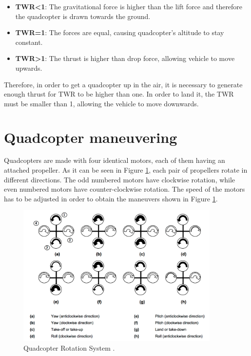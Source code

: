 \begin{itemize}
\item \textbf{TWR<1}: The gravitational force is higher than the lift force and therefore the quadcopter is drawn towards the ground.
\item \textbf{TWR=1}: The forces are equal, causing quadcopter's altitude to stay constant.
\item \textbf{TWR>1}: The thrust is higher than drop force, allowing vehicle to move upwards.
\end{itemize}

Therefore, in order to get a quadcopter up in the air, it is necessary to generate enough thrust for TWR to be higher than one. In order to land it, the TWR must be smaller than 1, allowing the vehicle to move downwards.

\section{Quadcopter maneuvering}
Quadcopters are made with four identical motors, each of them having an attached propeller. As it can be seen in Figure \ref{rollpitchyaw}, each pair of propellers rotate in different directions. The odd numbered motors have clockwise rotation, while even numbered motors have counter-clockwise rotation. The speed of the motors has to be adjusted in order to obtain the maneuvers shown in Figure \ref{rollpitchyaw}. 

\begin{figure}[H]
  \centering
    \includegraphics[width=0.9\textwidth]{images/rollpitchyaw.png}
	\caption{Quadcopter Rotation System \cite{RPYFig}.}
	\label{rollpitchyaw}
\end{figure}

